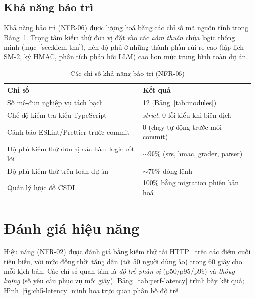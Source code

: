 \subsection{Khả năng bảo trì}
\label{subsec:nfr-maintain}

Khả năng bảo trì (NFR-06) được lượng hoá bằng các chỉ số mã nguồn tĩnh trong
Bảng~\ref{tab:nfr-maintain}. Trọng tâm kiểm thử đơn vị đặt vào các \textit{hàm
thuần} chứa logic thông minh (mục~\ref{sec:kiem-thu}), nên độ phủ ở những
thành phần rủi ro cao (lập lịch SM-2, ký HMAC, phân tích phản hồi LLM) cao hơn
mức trung bình toàn dự án.

\begin{table}[h]
  \centering
  \small
  \renewcommand{\arraystretch}{1.3}
  \begin{tabular}{|p{6.4cm}|p{8.0cm}|}
    \hline
    \textbf{Chỉ số} & \textbf{Kết quả} \\
    \hline
    Số mô-đun nghiệp vụ tách bạch & 12 (Bảng~\ref{tab:modules}) \\
    \hline
    Chế độ kiểm tra kiểu TypeScript & \textit{strict}; 0 lỗi kiểu khi biên dịch \\
    \hline
    Cảnh báo ESLint/Prettier trước commit & 0 (chạy tự động trước mỗi commit) \\
    \hline
    Độ phủ kiểm thử đơn vị các hàm logic cốt lõi & $\sim$90\% (srs, hmac, grader, parser) \\
    \hline
    Độ phủ kiểm thử trên toàn dự án & $\sim$70\% dòng lệnh \\
    \hline
    Quản lý lược đồ CSDL & 100\% bằng migration phiên bản hoá \\
    \hline
  \end{tabular}
  \caption{Các chỉ số khả năng bảo trì (NFR-06)}
  \label{tab:nfr-maintain}
\end{table}

\section{Đánh giá hiệu năng}
\label{sec:danh-gia-hieu-nang}

Hiệu năng (NFR-02) được đánh giá bằng kiểm thử tải HTTP~\cite{k6load} trên các
điểm cuối tiêu biểu, với mức đồng thời tăng dần (tới 50 người dùng ảo) trong
60 giây cho mỗi kịch bản. Các chỉ số quan tâm là \textit{độ trễ phân vị}
(p50/p95/p99) và \textit{thông lượng} (số yêu cầu phục vụ mỗi giây).
Bảng~\ref{tab:perf-latency} trình bày kết quả; Hình~\ref{fig:ch5-latency} minh
hoạ trực quan phân bố độ trễ.


